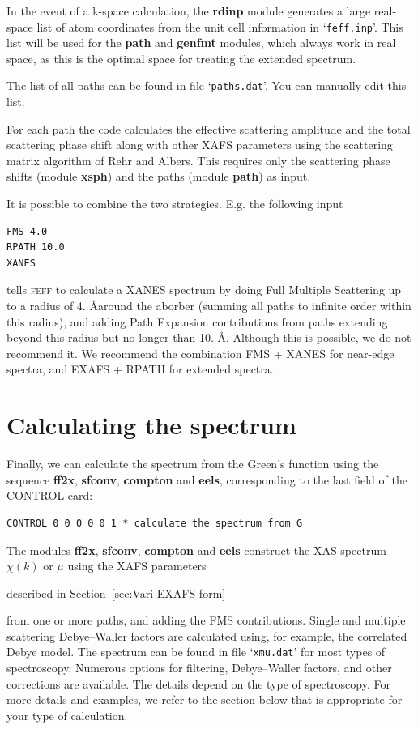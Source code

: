 \documentclass[11pt,oneside]{report} %
\newcommand{\program}[1]{\textsc{#1}}
\newcommand{\feff}{\program{feff}}
\newcommand{\file}[1]{`\texttt{#1}'}
\newcommand{\module}[1]{\textrm{\bf{#1}}}
\begin{document}
In the event of a k-space calculation, the \module{rdinp} module generates a
large real-space list of atom coordinates from the unit cell information in \file{feff.inp}.
This list will be used for the \module{path} and \module{genfmt} modules, which always work
in real space, as this is the optimal space for treating the extended spectrum.

The list of all paths can be found in file \file{paths.dat}.  You can manually edit this list.

For each path the code calculates the effective scattering amplitude
 and the total scattering phase
shift along with other XAFS parameters using the scattering matrix
algorithm of Rehr and Albers. This requires only the scattering phase shifts (module \module{xsph}) and
the paths (module \module{path}) as input.


It is possible to combine the two strategies.  E.g. the following input
\begin{verbatim}
FMS 4.0
RPATH 10.0
XANES
\end{verbatim}
tells {\feff} to calculate a XANES spectrum by doing Full Multiple Scattering up to a radius of 4. \AA around the aborber (summing all paths to infinite order within this radius), and adding Path Expansion contributions from paths extending beyond this radius but no longer than 10. \AA .  Although this is possible, we do not recommend it.  We recommend the combination FMS + XANES for near-edge spectra, and EXAFS + RPATH for extended spectra.



\section{Calculating the spectrum}
Finally, we can calculate the spectrum from the Green's function using the sequence \module{ff2x}, \module{sfconv}, \module{compton} and \module{eels}, corresponding to the last field of the CONTROL card:
\begin{verbatim}
CONTROL 0 0 0 0 0 1 * calculate the spectrum from G
\end{verbatim}

The modules \module{ff2x}, \module{sfconv}, \module{compton} and \module{eels} construct the XAS spectrum $\chi(k)$ or $\mu$ using the
XAFS parameters
\begin{latexonly}
  described in Section~\ref{sec:Vari-EXAFS-form} 
\end{latexonly}
from one or more paths, and adding the FMS contributions.
Single and multiple scattering Debye--Waller
factors are calculated using, for example, the correlated Debye model.
The spectrum can be found in file \file{xmu.dat} for most types of spectroscopy.  Numerous
options for filtering, Debye--Waller factors, and other corrections are
available.  The details depend on the type of spectroscopy.  For more details and examples, we refer to the section below that is appropriate for your type of calculation.
\end{document}
